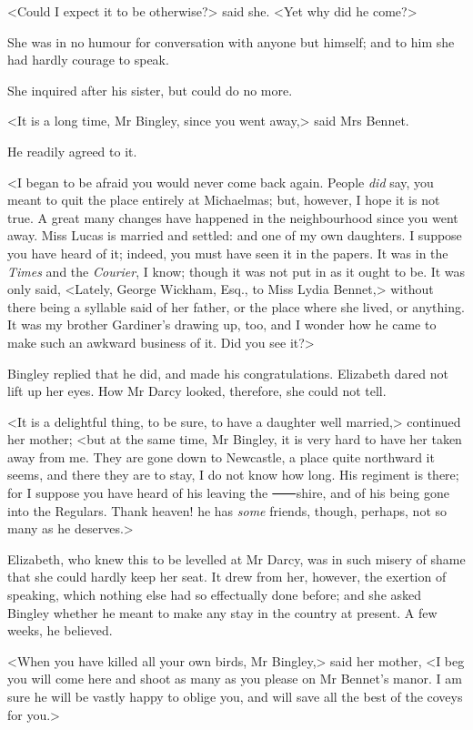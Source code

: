 <Could I expect it to be otherwise?> said she. <Yet why did he come?>

She was in no humour for conversation with anyone but himself; and to him she had hardly courage to speak.

She inquired after his sister, but could do no more.

<It is a long time, Mr Bingley, since you went away,> said Mrs Bennet.

He readily agreed to it.

<I began to be afraid you would never come back again. People \textit{did} say, you meant to quit the place entirely at Michaelmas; but, however, I hope it is not true. A great many changes have happened in the neighbourhood since you went away. Miss Lucas is married and settled: and one of my own daughters. I suppose you have heard of it; indeed, you must have seen it in the papers. It was in the \textit{Times} and the \textit{Courier}, I know; though it was not put in as it ought to be. It was only said, <Lately, George Wickham, Esq., to Miss Lydia Bennet,> without there being a syllable said of her father, or the place where she lived, or anything. It was my brother Gardiner's drawing up, too, and I wonder how he came to make such an awkward business of it. Did you see it?>

Bingley replied that he did, and made his congratulations. Elizabeth dared not lift up her eyes. How Mr Darcy looked, therefore, she could not tell.

<It is a delightful thing, to be sure, to have a daughter well married,> continued her mother; <but at the same time, Mr Bingley, it is very hard to have her taken away from me. They are gone down to Newcastle, a place quite northward it seems, and there they are to stay, I do not know how long. His regiment is there; for I suppose you have heard of his leaving the ⸺shire, and of his being gone into the Regulars. Thank heaven! he has \textit{some} friends, though, perhaps, not so many as he deserves.>

Elizabeth, who knew this to be levelled at Mr Darcy, was in such misery of shame that she could hardly keep her seat. It drew from her, however, the exertion of speaking, which nothing else had so effectually done before; and she asked Bingley whether he meant to make any stay in the country at present. A few weeks, he believed.

<When you have killed all your own birds, Mr Bingley,> said her mother, <I beg you will come here and shoot as many as you please on Mr Bennet's manor. I am sure he will be vastly happy to oblige you, and will save all the best of the coveys for you.>

